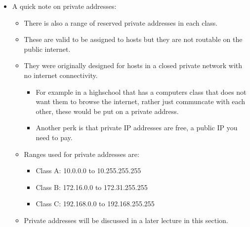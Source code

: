 \begin{itemize}
    \item A quick note on private addresses:
        \begin{itemize}
            \item There is also a range of reserved private addresses in each class.
            \item These are valid to be assigned to hosts but they are not routable on the public internet.
            \item They were originally designed for hosts in a closed private network with no internet connectivity.
                \begin{itemize}
                    \item For example in a highschool that has a computers class that does not want them to browse the internet, rather just communcate with each other, these would be put on a private address.
                    \item Another perk is that private IP addresses are free, a public IP you need to pay.
                \end{itemize}
            \item Ranges used for private addresses are:
                \begin{itemize}
                    \item Class A: 10.0.0.0 to 10.255.255.255
                    \item Class B: 172.16.0.0 to 172.31.255.255
                    \item Class C: 192.168.0.0 to 192.168.255.255
                \end{itemize}
            \item Private addresses will be discussed in a later lecture in this section.
        \end{itemize}
\end{itemize}


